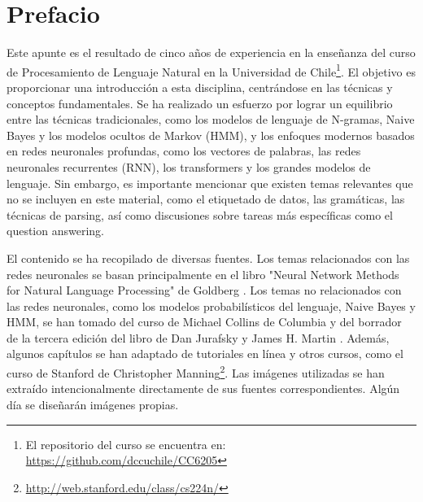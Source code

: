 \documentclass[11pt,fleqn]{book} %
\begin{document}
\pagestyle{empty} %

\tableofcontents %


\pagestyle{fancy} %


\chapter*{Prefacio}
Este apunte es el resultado de cinco años de experiencia en la enseñanza del curso de Procesamiento de Lenguaje Natural en la Universidad de Chile\footnote{El repositorio del curso se encuentra en: \url{https://github.com/dccuchile/CC6205}}. El objetivo es proporcionar una introducción a esta disciplina, centrándose en las técnicas y conceptos fundamentales. Se ha realizado un esfuerzo por lograr un equilibrio entre las técnicas tradicionales, como los modelos de lenguaje de N-gramas, Naive Bayes y los modelos ocultos de Markov (HMM), y los enfoques modernos basados en redes neuronales profundas, como los vectores de palabras, las redes neuronales recurrentes (RNN), los transformers y los grandes modelos de lenguaje. Sin embargo, es importante mencionar que existen temas relevantes que no se incluyen en este material, como el etiquetado de datos, las gramáticas, las técnicas de parsing, así como discusiones sobre tareas más específicas como el question answering.

El contenido se ha recopilado de diversas fuentes. Los temas relacionados con las redes neuronales se basan principalmente en el libro "Neural Network Methods for Natural Language Processing" de Goldberg \cite{goldberg2017neural}. Los temas no relacionados con las redes neuronales, como los modelos probabilísticos del lenguaje, Naive Bayes y HMM, se han tomado del curso de Michael Collins de Columbia \cite{collins2013language} y del borrador de la tercera edición del libro de Dan Jurafsky y James H. Martin \cite{JurafskyBook}. Además, algunos capítulos se han adaptado de tutoriales en línea y otros cursos, como el curso de Stanford de Christopher Manning\footnote{\url{http://web.stanford.edu/class/cs224n/}}. Las imágenes utilizadas se han extraído intencionalmente directamente de sus fuentes correspondientes. Algún día se diseñarán imágenes propias.


\end{document}
